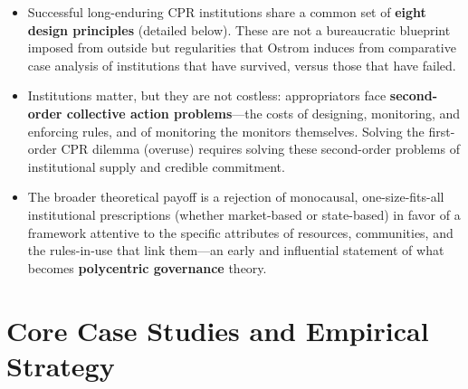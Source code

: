 \documentclass[12pt]{article}
\begin{document}
\begin{itemize}[leftmargin=*, itemsep=4pt]
    \item Successful long-enduring CPR institutions share a common set of \textbf{eight design principles} (detailed below). These are not a bureaucratic blueprint imposed from outside but regularities that Ostrom induces from comparative case analysis of institutions that have survived, versus those that have failed.
    \item Institutions matter, but they are not costless: appropriators face \textbf{second-order collective action problems}---the costs of designing, monitoring, and enforcing rules, and of monitoring the monitors themselves. Solving the first-order CPR dilemma (overuse) requires solving these second-order problems of institutional supply and credible commitment.
    \item The broader theoretical payoff is a rejection of monocausal, one-size-fits-all institutional prescriptions (whether market-based or state-based) in favor of a framework attentive to the specific attributes of resources, communities, and the rules-in-use that link them---an early and influential statement of what becomes \textbf{polycentric governance} theory.
\end{itemize}

\section{Core Case Studies and Empirical Strategy}
\end{document}
